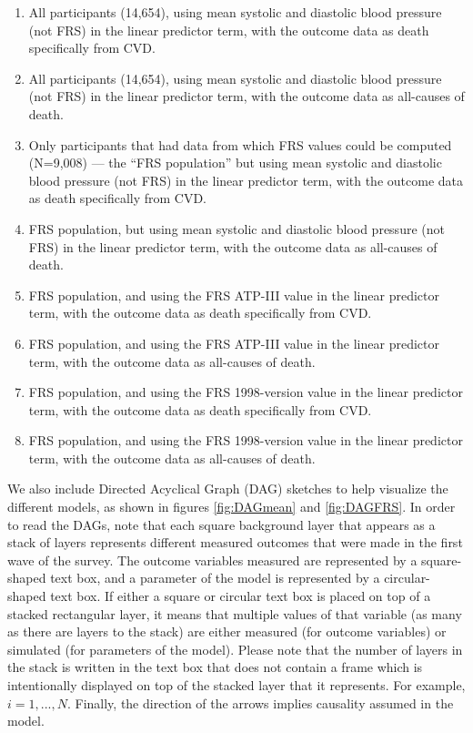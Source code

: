\documentclass[
]{article}
\begin{document}
\begin{enumerate}
\item All participants (14,654), using mean systolic and diastolic blood pressure (not FRS) in the linear predictor term, with the outcome data as death specifically from CVD.
\item All participants (14,654), using mean systolic and diastolic blood pressure (not FRS) in the linear predictor term, with the outcome data as all-causes of death.
\item Only participants that had data from which FRS values could be computed (N=9,008) --- the ``FRS population'' but using mean systolic and diastolic blood pressure (not FRS) in the linear predictor term, with the outcome data as death specifically from CVD.
\item FRS population, but using mean systolic and diastolic blood pressure (not FRS) in the linear predictor term, with the outcome data as all-causes of death.
\item FRS population, and using the FRS ATP-III value in the linear predictor term, with the outcome data as death specifically from CVD.
\item FRS population, and using the FRS ATP-III value in the linear predictor term, with the outcome data as all-causes of death.
\item FRS population, and using the FRS 1998-version value in the linear predictor term, with the outcome data as death specifically from CVD.
\item FRS population, and using the FRS 1998-version value in the linear predictor term, with the outcome data as all-causes of death.
\label{tab:runnums}
\end{enumerate}

We also include Directed Acyclical Graph (DAG) sketches to help visualize the different models, as shown in figures \ref{fig:DAGmean} and \ref{fig:DAGFRS}.
In order to read the DAGs, note that each square background layer that appears as a stack of layers represents different measured outcomes that were made in the first wave of the survey.
The outcome variables measured are represented by a square-shaped text box, and a parameter of the model is represented by a circular-shaped text box. If either a square or circular text box is placed on top of a stacked rectangular layer, it means that multiple values of that variable (as many as there are layers to the stack) are either measured (for outcome variables) or simulated (for parameters of the model). Please note that the number of layers in the stack is written in the text box that does not contain a frame which is intentionally displayed on top of the stacked layer that it represents. For example, \(i=1,...,N\).
Finally, the direction of the arrows implies causality assumed in the model.
\end{document}
